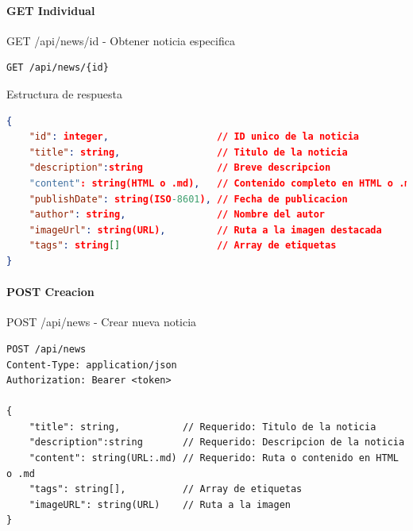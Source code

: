 \documentclass[11pt,a4paper]{article}
\begin{document}
\paragraph{GET Individual}

\begin{center}
	\begin{minipage}{\textwidth}
		\begin{codebox}{GET /api/news/{id} - Obtener noticia especifica}
			\begin{lstlisting}[language=HTTP]
GET /api/news/{id}
\end{lstlisting}
		\end{codebox}
	\end{minipage}
\end{center}

\begin{center}
	\begin{minipage}{\textwidth}
		\begin{codebox}{Estructura de respuesta}
			\begin{lstlisting}[language=json]
{
    "id": integer,                   // ID unico de la noticia
    "title": string,                 // Titulo de la noticia
	"description":string  			 // Breve descripcion
    "content": string(HTML o .md),   // Contenido completo en HTML o .md
    "publishDate": string(ISO-8601), // Fecha de publicacion
    "author": string,                // Nombre del autor
    "imageUrl": string(URL),         // Ruta a la imagen destacada
    "tags": string[]                 // Array de etiquetas
}
\end{lstlisting}
		\end{codebox}
	\end{minipage}
\end{center}

\paragraph{POST Creacion}
\begin{center}
	\begin{minipage}{\textwidth}
		\begin{codebox}{POST /api/news - Crear nueva noticia}
			\begin{lstlisting}[language=HTTP]
POST /api/news
Content-Type: application/json
Authorization: Bearer <token>

{
    "title": string,           // Requerido: Titulo de la noticia
	"description":string  	   // Requerido: Descripcion de la noticia
    "content": string(URL:.md) // Requerido: Ruta o contenido en HTML o .md
    "tags": string[],          // Array de etiquetas 
    "imageURL": string(URL)    // Ruta a la imagen
}
\end{lstlisting}
		\end{codebox}
	\end{minipage}
\end{center}
\end{document}
